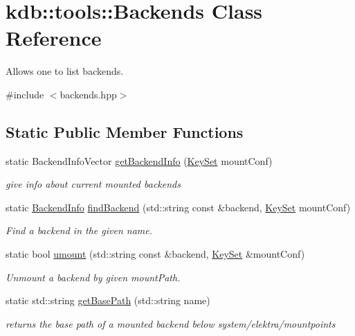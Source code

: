 \hypertarget{classkdb_1_1tools_1_1Backends}{\section{kdb\-:\-:tools\-:\-:Backends Class Reference}
\label{classkdb_1_1tools_1_1Backends}
}


Allows one to list backends.  




{\ttfamily \#include $<$backends.\-hpp$>$}

\subsection*{Static Public Member Functions}
\begin{DoxyCompactItemize}
\item 
static Backend\-Info\-Vector \hyperlink{classkdb_1_1tools_1_1Backends_a82b334d8a1e01df664462c6dd43bd7e1}{get\-Backend\-Info} (\hyperlink{classkdb_1_1KeySet}{Key\-Set} mount\-Conf)
\begin{DoxyCompactList}\small\item\em give info about current mounted backends \end{DoxyCompactList}\item 
static \hyperlink{structkdb_1_1tools_1_1BackendInfo}{Backend\-Info} \hyperlink{classkdb_1_1tools_1_1Backends_a12ba74eaa70f5be9f39a1814dd61e85e}{find\-Backend} (std\-::string const \&backend, \hyperlink{classkdb_1_1KeySet}{Key\-Set} mount\-Conf)
\begin{DoxyCompactList}\small\item\em Find a backend in the given name. \end{DoxyCompactList}\item 
static bool \hyperlink{classkdb_1_1tools_1_1Backends_aca36f903059e3df0f2ded569d6d8df8c}{umount} (std\-::string const \&backend, \hyperlink{classkdb_1_1KeySet}{Key\-Set} \&mount\-Conf)
\begin{DoxyCompactList}\small\item\em Unmount a backend by given mount\-Path. \end{DoxyCompactList}\item 
static std\-::string \hyperlink{classkdb_1_1tools_1_1Backends_a76af9122c56426f4d0119e44719c7309}{get\-Base\-Path} (std\-::string name)
\begin{DoxyCompactList}\small\item\em returns the base path of a mounted backend below system/elektra/mountpoints \end{DoxyCompactList}\end{DoxyCompactItemize}
